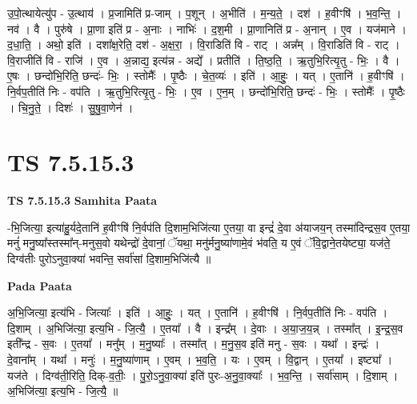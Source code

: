 \documentclass[17pt]{extarticle}
\begin{document}
उ॒पो॒त्थायेत्यु॑प - उ॒त्थाय॑ । प्र॒जामिति॑ प्र-जाम् । प॒शून् । अ॒भीति॑ । म॒न्य॒ते॒ । दश॑ । ह॒वीꣳषि॑ । भ॒व॒न्ति॒ । नव॑ । वै । पुरु॑षे । प्रा॒णा इति॑ प्र - अ॒नाः । नाभिः॑ । द॒श॒मी । प्रा॒णानिति॑ प्र - अ॒नान् । ए॒व । यज॑माने । द॒धा॒ति॒ । अथो॒ इति॑ । दशा᳚क्ष॒रेति॒ दश॑ - अ॒क्ष॒रा॒ । वि॒राडिति॑ वि - राट् । अन्न᳚म् । वि॒राडिति॑ वि - राट् । वि॒राजीति॑ वि - राजि॑ । ए॒व । अ॒न्नाद्य॒ इत्य॑न्न - अद्ये᳚ । प्रतीति॑ । ति॒ष्ठ॒ति॒ । ऋ॒तुभि॒रित्यृ॒तु - भिः॒ । वै । ए॒षः । छन्दो॑भि॒रिति॒ छन्दः॑- भिः॒ । स्तोमैः᳚ । पृ॒ष्ठैः । चे॒त॒व्यः॑ । इति॑ । आ॒हुः॒ । यत् । ए॒तानि॑ । ह॒वीꣳषि॑ । नि॒र्वप॒तीति॑ निः - वप॑ति । ऋ॒तुभि॒रित्यृ॒तु - भिः॒ । ए॒व । ए॒न॒म् । छन्दो॑भि॒रिति॒ छन्दः॑ - भिः॒ । स्तोमैः᳚ । पृ॒ष्ठैः । चि॒नु॒ते॒ । दिशः॑ । सु॒षु॒वा॒णेन॑ ।  \newline





\section{ TS 7.5.15.3 }

\textbf{TS 7.5.15.3 } \newline
\textbf{Samhita Paata} \newline

-भि॒जित्या॒ इत्या॑हु॒र्यदे॒तानि॑ ह॒वीꣳषि॑ नि॒र्वप॑ति दि॒शाम॒भिजि॑त्या ए॒तया॒ वा इन्द्रं॑ दे॒वा अ॑याजय॒न् तस्मा॑दिन्द्रस॒व ए॒तया॒ मनुं॑ मनु॒ष्या᳚स्तस्मा᳚न्-मनुस॒वो यथेन्द्रो॑ दे॒वानां॒ ॅयथा॒ मनु॑र्मनु॒ष्या॑णामे॒वं भ॑वति॒ य ए॒वं ॅवि॒द्वाने॒तयेष्ट्या॒ यज॑ते॒ दिग्व॑तीः पुरोऽनुवा॒क्या॑ भवन्ति॒ सर्वा॑सां दि॒शाम॒भिजि॑त्यै ॥ \newline

\textbf{Pada Paata} \newline

अ॒भि॒जित्या॒ इत्य॑भि - जित्याः᳚ । इति॑ । आ॒हुः॒ । यत् । ए॒तानि॑ । ह॒वीꣳषि॑ । नि॒र्वप॒तीति॑ निः - वप॑ति । दि॒शाम् । अ॒भिजि॑त्या॒ इत्य॒भि - जि॒त्यै॒ । ए॒तया᳚ । वै । इन्द्र᳚म् । दे॒वाः । अ॒या॒ज॒य॒न्न् । तस्मा᳚त् । इ॒न्द्र॒स॒व इती᳚न्द्र - स॒वः । ए॒तया᳚ । मनु᳚म् । म॒नु॒ष्याः᳚ । तस्मा᳚त् । म॒नु॒स॒व इति॑ मनु - स॒वः । यथा᳚ । इन्द्रः॑ । दे॒वाना᳚म् । यथा᳚ । मनुः॑ । म॒नु॒ष्या॑णाम् । ए॒वम् । भ॒व॒ति॒ । यः । ए॒वम् । वि॒द्वान् । ए॒तया᳚ । इष्ट्या᳚ । यज॑ते । दिग्व॑ती॒रिति॒ दिक्-व॒तीः॒ । पु॒रो॒ऽनु॒वा॒क्या॑ इति॑ पुरः-अ॒नु॒वा॒क्याः᳚ । भ॒व॒न्ति॒ । सर्वा॑साम् । दि॒शाम् । अ॒भिजि॑त्या॒ इत्य॒भि - जि॒त्यै॒ ॥  \newline
\end{document}

